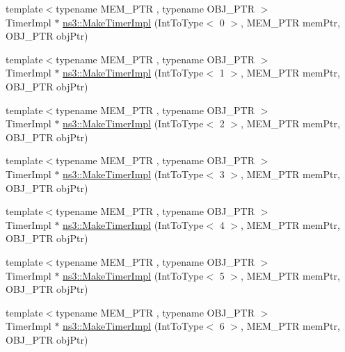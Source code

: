 \begin{DoxyCompactItemize}
\item 
{\footnotesize template$<$typename M\+E\+M\+\_\+\+P\+TR , typename O\+B\+J\+\_\+\+P\+TR $>$ }\\Timer\+Impl $\ast$ \hyperlink{group__timerimpl_ga189516cfbc46659ce05183c9bb4f0a53}{ns3\+::\+Make\+Timer\+Impl} (Int\+To\+Type$<$ 0 $>$, M\+E\+M\+\_\+\+P\+TR mem\+Ptr, O\+B\+J\+\_\+\+P\+TR obj\+Ptr)
\item 
{\footnotesize template$<$typename M\+E\+M\+\_\+\+P\+TR , typename O\+B\+J\+\_\+\+P\+TR $>$ }\\Timer\+Impl $\ast$ \hyperlink{group__timerimpl_ga1f4bce6c34cdc484fb7e94e47f87f7fd}{ns3\+::\+Make\+Timer\+Impl} (Int\+To\+Type$<$ 1 $>$, M\+E\+M\+\_\+\+P\+TR mem\+Ptr, O\+B\+J\+\_\+\+P\+TR obj\+Ptr)
\item 
{\footnotesize template$<$typename M\+E\+M\+\_\+\+P\+TR , typename O\+B\+J\+\_\+\+P\+TR $>$ }\\Timer\+Impl $\ast$ \hyperlink{group__timerimpl_ga088865b78dbf7be93f27c8179a163fff}{ns3\+::\+Make\+Timer\+Impl} (Int\+To\+Type$<$ 2 $>$, M\+E\+M\+\_\+\+P\+TR mem\+Ptr, O\+B\+J\+\_\+\+P\+TR obj\+Ptr)
\item 
{\footnotesize template$<$typename M\+E\+M\+\_\+\+P\+TR , typename O\+B\+J\+\_\+\+P\+TR $>$ }\\Timer\+Impl $\ast$ \hyperlink{group__timerimpl_gaba31064449f41752f5cbf720d067de4f}{ns3\+::\+Make\+Timer\+Impl} (Int\+To\+Type$<$ 3 $>$, M\+E\+M\+\_\+\+P\+TR mem\+Ptr, O\+B\+J\+\_\+\+P\+TR obj\+Ptr)
\item 
{\footnotesize template$<$typename M\+E\+M\+\_\+\+P\+TR , typename O\+B\+J\+\_\+\+P\+TR $>$ }\\Timer\+Impl $\ast$ \hyperlink{group__timerimpl_ga2670f9b42fcaf92d263baceb00ef9c11}{ns3\+::\+Make\+Timer\+Impl} (Int\+To\+Type$<$ 4 $>$, M\+E\+M\+\_\+\+P\+TR mem\+Ptr, O\+B\+J\+\_\+\+P\+TR obj\+Ptr)
\item 
{\footnotesize template$<$typename M\+E\+M\+\_\+\+P\+TR , typename O\+B\+J\+\_\+\+P\+TR $>$ }\\Timer\+Impl $\ast$ \hyperlink{group__timerimpl_ga007db2f67c4d184c2e6591e1b2e5815e}{ns3\+::\+Make\+Timer\+Impl} (Int\+To\+Type$<$ 5 $>$, M\+E\+M\+\_\+\+P\+TR mem\+Ptr, O\+B\+J\+\_\+\+P\+TR obj\+Ptr)
\item 
{\footnotesize template$<$typename M\+E\+M\+\_\+\+P\+TR , typename O\+B\+J\+\_\+\+P\+TR $>$ }\\Timer\+Impl $\ast$ \hyperlink{group__timerimpl_ga5aff48e5186a6d90b65835697e6719bf}{ns3\+::\+Make\+Timer\+Impl} (Int\+To\+Type$<$ 6 $>$, M\+E\+M\+\_\+\+P\+TR mem\+Ptr, O\+B\+J\+\_\+\+P\+TR obj\+Ptr)
\end{DoxyCompactItemize}


